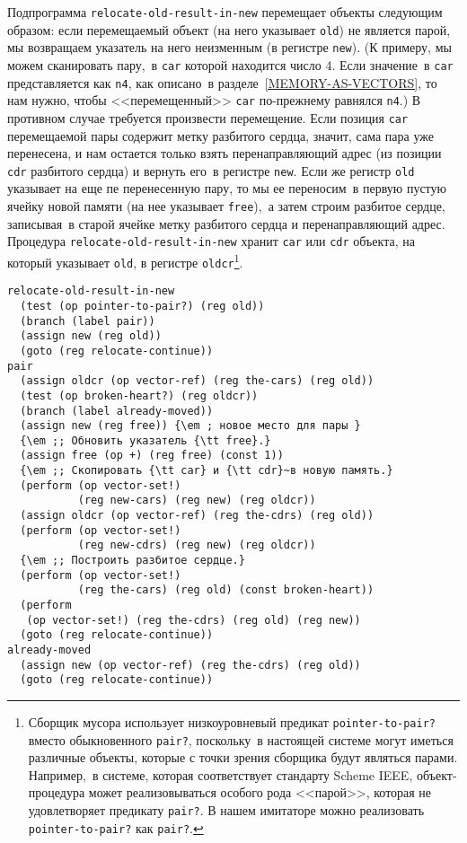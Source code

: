 Подпрограмма {\tt relocate-old-result-in-new}
перемещает объекты следующим образом: если перемещаемый объект (на
него указывает {\tt old}) не является парой, мы возвращаем
указатель на него неизменным (в регистре {\tt new}). (К
примеру, мы можем сканировать пару,~в {\tt car} которой
находится число 4.  Если значение~в {\tt car} представляется
как {\tt n4}, как описано~в 
разделе~\ref{MEMORY-AS-VECTORS}, то нам нужно, чтобы
<<перемещенный>> {\tt car} по-прежнему равнялся
{\tt n4}.)  В противном случае требуется произвести
перемещение.  Если позиция {\tt car} перемещаемой пары содержит
метку разбитого сердца, значит, сама пара уже перенесена, и нам
остается только взять перенаправляющий адрес (из позиции
{\tt cdr} разбитого сердца) и вернуть его~в регистре
{\tt new}.  Если же  регистр {\tt old} указывает на еще
пе перенесенную пару, то мы ее переносим~в первую пустую ячейку новой
памяти (на нее указывает {\tt free}),~а затем строим разбитое
сердце, записывая~в старой ячейке метку разбитого сердца и
перенаправляющий адрес.  Процедура
{\tt relocate-old-result-in-new} хранит {\tt car} или
{\tt cdr} объекта, на который указывает {\tt old}, в
регистре {\tt oldcr}\footnote{Сборщик мусора использует низкоуровневый предикат
{\tt pointer-to-pair?} вместо обыкновенного {\tt pair?},
поскольку~в настоящей системе могут иметься различные объекты, которые с
точки зрения сборщика будут являться парами.  Например,~в системе,
которая соответствует стандарту Scheme IEEE, объект-процедура может
реализовываться особого рода <<парой>>, которая не удовлетворяет
предикату {\tt pair?}.  В нашем имитаторе можно реализовать
{\tt pointer-to-pair?} как {\tt pair?}.
}.

\begin{Verbatim}[fontsize=\small]
relocate-old-result-in-new
  (test (op pointer-to-pair?) (reg old))
  (branch (label pair))
  (assign new (reg old))
  (goto (reg relocate-continue))
pair
  (assign oldcr (op vector-ref) (reg the-cars) (reg old))
  (test (op broken-heart?) (reg oldcr))
  (branch (label already-moved))
  (assign new (reg free)) {\em ; новое место для пары }
  {\em ;; Обновить указатель {\tt free}.}
  (assign free (op +) (reg free) (const 1))
  {\em ;; Скопировать {\tt car} и {\tt cdr}~в новую память.}
  (perform (op vector-set!)
           (reg new-cars) (reg new) (reg oldcr))
  (assign oldcr (op vector-ref) (reg the-cdrs) (reg old))
  (perform (op vector-set!)
           (reg new-cdrs) (reg new) (reg oldcr))
  {\em ;; Построить разбитое сердце.}
  (perform (op vector-set!)
           (reg the-cars) (reg old) (const broken-heart))
  (perform
   (op vector-set!) (reg the-cdrs) (reg old) (reg new))
  (goto (reg relocate-continue))
already-moved
  (assign new (op vector-ref) (reg the-cdrs) (reg old))
  (goto (reg relocate-continue))
\end{Verbatim}

